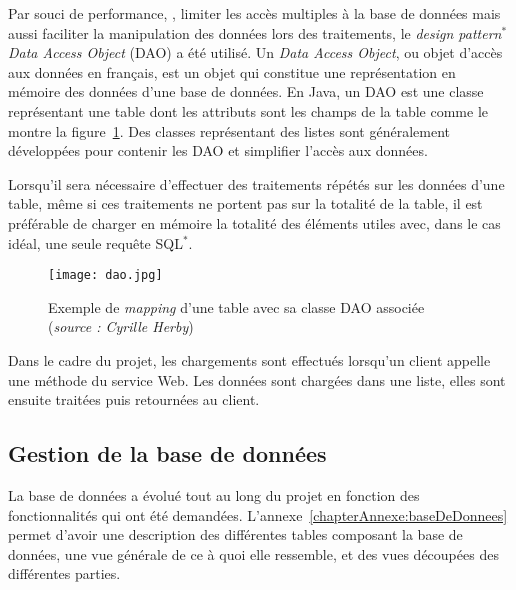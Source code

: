 Par souci de performance, \cad, limiter les acc\`es multiples \`a la base de donn\'ees mais aussi faciliter la manipulation des donn\'ees lors des traitements, le \textit{design pattern}$^*$ \textit{Data Access Object} (DAO) a \'et\'e utilis\'e.
Un \textit{Data Access Object}, ou objet d'acc\`es aux donn\'ees en fran\c{c}ais, est un objet qui constitue une repr\'esentation en m\'emoire des donn\'ees d'une base de donn\'ees.
En Java, un DAO est une classe repr\'esentant une table dont les attributs sont les champs de la table comme le montre la figure~\ref{figure:dao}.
Des classes repr\'esentant des listes sont g\'en\'eralement d\'evelopp\'ees pour contenir les DAO et simplifier l'acc\`es aux donn\'ees.

Lorsqu'il sera n\'ecessaire d'effectuer des traitements r\'ep\'et\'es sur les donn\'ees d'une table, m\^eme si ces traitements ne portent pas sur la totalit\'e de la table, il est pr\'ef\'erable de charger en m\'emoire la totalit\'e des \'el\'ements utiles avec, dans le cas id\'eal, une seule requ\^ete SQL$^*$.

\begin{figure}[!ht]
	\centering
	\texttt{[image: dao.jpg]}
	\caption{Exemple de \textit{mapping} d'une table avec sa classe DAO associ\'ee (\textit{source : Cyrille Herby})}
	\label{figure:dao}

\end{figure}

Dans le cadre du projet, les chargements sont effectu\'es lorsqu'un client appelle une m\'ethode du service Web. 
Les donn\'ees sont charg\'ees dans une liste, elles sont ensuite trait\'ees puis retourn\'ees au client.

\subsection{Gestion de la base de donn\'ees}

La base de donn\'ees a \'evolu\'e tout au long du projet en fonction des fonctionnalit\'es qui ont \'et\'e demand\'ees.
L'annexe~\ref{chapterAnnexe:baseDeDonnees} permet d'avoir une description des diff\'erentes tables composant la base de donn\'ees, une vue g\'en\'erale de ce \`a quoi elle ressemble, et des vues d\'ecoup\'ees des diff\'erentes parties.

